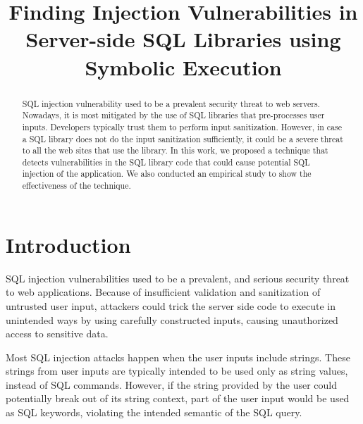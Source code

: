 \documentclass[conference]{IEEEtran}
\begin{document}
\title{Finding Injection Vulnerabilities in Server-side SQL Libraries using Symbolic Execution}

\author{
}

\maketitle

\begin{abstract}

SQL injection vulnerability used to be a prevalent security threat to web servers. Nowadays, it is most mitigated by the use of SQL libraries that pre-processes user inputs. Developers typically trust them to perform input sanitization. However, in case a SQL library does not do the input sanitization sufficiently, it could be a severe threat to all the web sites that use the library. In this work, we proposed a technique that detects vulnerabilities in the SQL library code that could cause potential SQL injection of the application. We also conducted an empirical study to show the effectiveness of the technique.

\end{abstract}

\IEEEpeerreviewmaketitle

\section{Introduction}
\label{introduction}

SQL injection vulnerabilities used to be a prevalent, and serious security threat to web applications. Because of insufficient validation and sanitization of untrusted user input, attackers could trick the server side code to execute in unintended ways by using carefully constructed inputs, causing unauthorized access to sensitive data.

Most SQL injection attacks happen when the user inputs include strings. These strings from user inputs are typically intended to be used only as string values, instead of SQL commands. However, if the string provided by the user could potentially break out of its string context, part of the user input would be used as SQL keywords, violating the intended semantic of the SQL query. 
\end{document}
